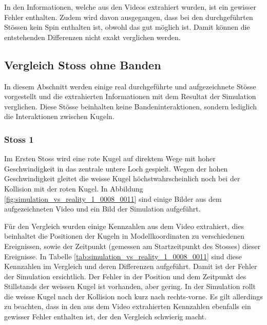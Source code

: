 In den Informationen, welche aus den Videos extrahiert wurden, ist ein gewisser Fehler enthalten.
Zudem wird davon ausgegangen, dass bei den durchgeführten Stössen kein Spin enthalten ist, obwohl das gut möglich ist.
Damit können die entstehenden Differenzen nicht exakt verglichen werden.

\newpage
\subsection{Vergleich Stoss ohne Banden}
In diesem Abschnitt werden einige real durchgeführte und aufgezeichnete Stösse vorgestellt und die extrahierten Informationen mit
dem Resultat der Simulation verglichen.
Diese Stösse beinhalten keine Bandeninteraktionen, sondern lediglich die Interaktionen zwischen Kugeln.

\subsubsection{Stoss 1}
Im Ersten Stoss wird eine rote Kugel auf direktem Wege mit hoher Geschwindigkeit in das zentrale untere Loch gespielt.
Wegen der hohen Geschwindigkeit gleitet die weisse Kugel höchstwahrscheinlich noch bei der Kollision mit der roten Kugel.
In Abbildung \ref{fig:simulation_vs_reality_1_0008_0011} sind einige Bilder aus dem aufgezeichneten Video und ein Bild
der Simulation aufgeführt.

Für den Vergleich wurden einige Kennzahlen aus dem Video extrahiert, dies beinhaltet die Positionen der Kugeln
in Modellkoordinaten zu verschiedenen Ereignissen, sowie der Zeitpunkt (gemessen am Startzeitpunkt des Stosses) dieser Ereignisse.
In Tabelle \ref{tab:simulation_vs_reality_1_0008_0011} sind diese Kennzahlen im Vergleich und deren Differenzen aufgeführt.
Damit ist der Fehler der Simulation ersichtlich.
Der Fehler in der Position und dem Zeitpunkt des Stillstands der weissen Kugel ist vorhanden, aber gering.
In der Simulation rollt die weisse Kugel nach der Kollision noch kurz nach rechts-vorne.
Es gilt allerdings zu beachten, dass in den aus dem Video extrahierten Kennzahlen ebenfalls ein
gewisser Fehler enthalten ist, der den Vergleich schwierig macht.

